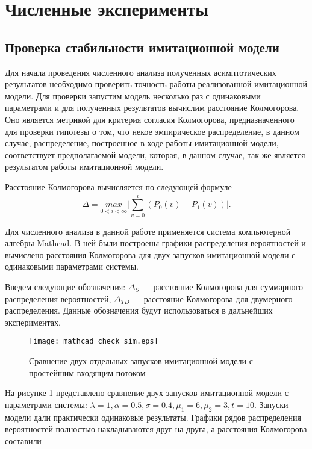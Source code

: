 \section{Численные эксперименты}
\subsection{Проверка стабильности имитационной модели}
Для начала проведения численного анализа полученных асимптотических результатов необходимо проверить точность работы реализованной имитационной модели. Для проверки запустим модель несколько раз с одинаковыми параметрами и для полученных результатов вычислим расстояние Колмогорова. Оно является метрикой для критерия согласия Колмогорова, предназначенного для проверки гипотезы о том, что некое эмпирическое распределение, в данном случае, распределение, построенное в ходе работы имитационной модели, соответствует предполагаемой модели, которая, в данном случае, так же является результатом работы имитационной модели.

Расстояние Колмогорова вычисляется по следующей формуле
\begin{equation*}
	\Delta = \underset{0 < i < \infty}{max}\bigg\rvert \sum_{v=0}^{i} (P_0(v) - P_1(v))\bigg\rvert.
\end{equation*}

Для численного анализа в данной работе применяется система компьютерной алгебры Mathcad. В ней были построены графики распределения вероятностей и вычислено расстояния Колмогорова для двух запусков имитационной модели с одинаковыми параметрами системы.

Введем следующие обозначения: $\Delta_S$ --- расстояние Колмогорова для суммарного распределения вероятностей, $\Delta_{TD}$ --- расстояние Колмогорова для двумерного распределения. Данные обозначения будут использоваться в дальнейших экспериментах.

\begin{figure}[H]
	\centering
	\texttt{[image: mathcad\_check\_sim.eps]}
	\caption{Сравнение двух отдельных запусков имитационной модели с простейшим входящим потоком}
	\label{experiments_kol_dist_sim}
\end{figure} 

На рисунке \ref{experiments_kol_dist_sim} представлено сравнение двух запусков имитационной модели с параметрами системы: $\lambda = 1, \alpha = 0.5, \sigma = 0.4, \mu_{1} = 6, \mu_{2} = 3, t = 10 $. Запуски модели дали практически одинаковые результаты. Графики рядов распределения вероятностей полностью накладываются друг на друга, а расстояния Колмогорова составили

